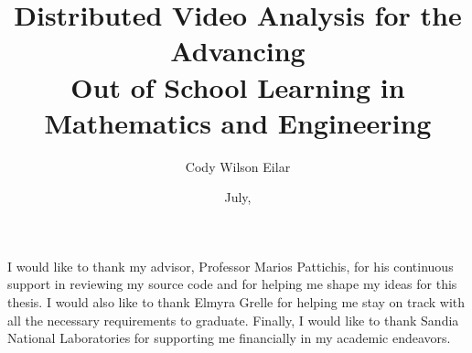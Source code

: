 \documentclass[botnum, fleqn]{unmeethesis}
\begin{document}
  \frontmatter




  \title{Distributed Video Analysis  for the  Advancing  \\
  Out of School Learning in Mathematics and Engineering}

  \author{Cody Wilson Eilar}





  \date{July, \thisyear}

  \maketitle



  \begin{acknowledgments}
    \vspace{1.1in}
    I would like to thank my advisor, Professor Marios Pattichis, for his
    continuous support in reviewing my source code and for helping me shape my
    ideas for this thesis. I would also like to thank Elmyra Grelle for helping
    me stay on track with all the necessary requirements to graduate. Finally, I
    would like to thank Sandia National Laboratories for supporting me
    financially in my academic endeavors.
  \end{acknowledgments}

  \maketitleabstract %
\end{document}
